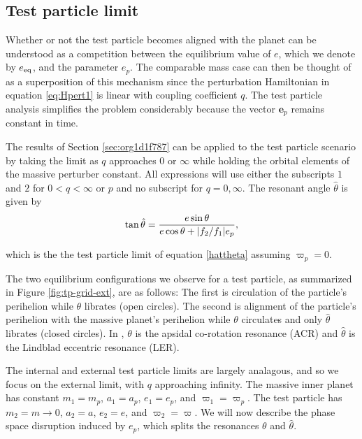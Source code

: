 \documentclass[usenatbib,twocolumn]{mnras}
\DeclarePairedDelimiter{\abs}{|}{|}
\begin{document}
\subsection{Test particle limit}
\label{sec:org87390a2}
Whether or not the test particle becomes aligned with the planet can
be understood as a competition between the equilibrium value of \(e\), which
we denote by \(e_{\rm eq}\),
and the parameter \(e_p\). The comparable mass case can then be thought
of as a superposition of this mechanism since the perturbation
Hamiltonian in equation \eqref{eq:Hpert1} is linear with coupling
coefficient \(q\). The test particle
analysis simplifies the problem considerably because the vector
\(\mathbf{e}_p\) remains constant in time. 

The results of Section \ref{sec:org1d1f787} can be applied to the
test particle scenario by taking the limit as \(q\) approaches \(0\) or
\(\infty\) while holding the orbital elements of the massive perturber
constant.  All expressions will use either the subscripts \(1\)
and \(2\) for \(0<q<\infty\) or \(p\) and no subscript for \(q=0,\infty\).
The resonant angle \(\hat\theta\) is given by
\begin{align}
  \tan\hat\theta = \frac{e\sin\theta}{e\cos\theta + \abs{f_2/f_1}e_p},
\end{align}

\noindent which is the the test particle limit of equation
\eqref{hattheta} assuming \(\varpi_p=0\).

The two equilibrium configurations we observe for a test particle, as
summarized in Figure \ref{fig:tp-grid-ext}, are as follows: The first is
circulation of the particle's perihelion while \(\theta\) librates (open
circles).  The second is alignment of the particle's perihelion with
the massive planet's perihelion while \(\theta\) circulates and only
\(\hat\theta\) librates (closed circles).  In
\citet{moutamid14_coupl_between_corot_lindb_reson}, \(\theta\) is the
apsidal co-rotation resonance (ACR) and \(\hat\theta\) is the Lindblad
eccentric resonance (LER).

The internal and external test particle limits are largely analagous,
and so we focus on the external limit, with \(q\) approaching infinity.
The massive inner planet has constant \(m_1=m_p\), \(a_1=a_p\), \(e_1=e_p\),
and \(\varpi_1=\varpi_p\). The test particle has \(m_2=m\to0\), \(a_2=a\),
\(e_2=e\), and \(\varpi_2=\varpi\).  We will now describe the phase space
disruption induced by \(e_p\), which splits the resonances \(\theta\) and
\(\hat\theta\). 
\end{document}
